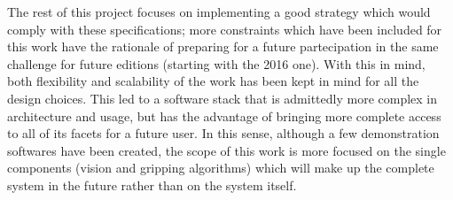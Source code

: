 The rest of this project focuses on implementing a good strategy which
would comply with these specifications; more constraints which have
been included for this work have the rationale of preparing for a
future partecipation in the same challenge for future editions
(starting with the 2016 one). With this in mind, both flexibility and
scalability of the work has been kept in mind for all the design
choices. This led to a software stack that is admittedly more
complex in architecture and usage, but has the advantage of bringing
more complete access to all of its facets for a future user. In this
sense, although a few demonstration softwares have been created, the
scope of this work is more focused on the single components (vision
and gripping algorithms) which will make up the complete system in the
future rather than on the system itself.

